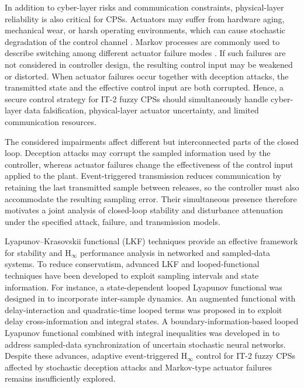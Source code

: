 \documentclass[preprint,review,fleqn,sort&compress,3p]{elsarticle}
\theoremstyle{definition} %
\theoremstyle{definition}%
\newif\ifreviewmarkup
\DeclareRobustCommand{\revadd}[1]{{\ifreviewmarkup\color{revisiongreen}\hypersetup{linkcolor=revisiongreen,citecolor=revisiongreen}\fi#1}}
\begin{document}
In addition to cyber-layer risks and communication constraints, physical-layer
reliability is also critical for CPSs. Actuators may suffer from hardware aging,
mechanical wear, or harsh operating environments, which can cause stochastic
degradation of the control channel
\cite{chenProbabilisticEventTriggeredPolicy2023,caiAdaptiveFaulttolerantControl2025}.
Markov processes are commonly used to describe switching among different actuator
failure modes \cite{yaoMultiSensorBasedSwitchingEventTriggered2024,xuAsynchronousEventTriggeredControl2024}.
If such failures are not considered in controller design, the resulting control
input may be weakened or distorted. When actuator failures occur together with
deception attacks, the
transmitted state and the effective control input are both corrupted. Hence, a
secure control strategy for IT-2 fuzzy CPSs should simultaneously handle
cyber-layer data falsification, physical-layer actuator uncertainty, and limited
communication resources.

\label{rev:M07}\revadd{The considered impairments affect different but interconnected parts of the closed loop. Deception attacks may corrupt the sampled information used by the controller, whereas actuator failures change the effectiveness of the control input applied to the plant. Event-triggered transmission reduces communication by retaining the last transmitted sample between releases, so the controller must also accommodate the resulting sampling error. Their simultaneous presence therefore motivates a joint analysis of closed-loop stability and disturbance attenuation under the specified attack, failure, and transmission models.}

Lyapunov--Krasovskii functional (LKF) techniques provide an effective framework for stability and $\mathrm{H}_\infty$ performance analysis in networked and sampled-data systems. To reduce conservatism, advanced LKF and looped-functional techniques
have been developed to exploit sampling intervals and state information. For
instance, a state-dependent looped Lyapunov functional was designed in
\cite{lianNewResultsStability2020} to incorporate inter-sample dynamics. An
augmented functional with delay-interaction and quadratic-time looped terms was
proposed in \cite{zhangMixedDelayBasedAugmentedFunctional2024} to exploit delay
cross-information and integral states. A boundary-information-based looped
Lyapunov functional combined with integral inequalities was developed in
\cite{ganesanSynchronizationStochasticNeural2024} to address sampled-data synchronization of uncertain stochastic neural networks. Despite these advances, adaptive event-triggered $\mathrm{H}_\infty$ control for IT-2 fuzzy CPSs affected by stochastic deception attacks and Markov-type actuator failures remains insufficiently explored.
\end{document}
